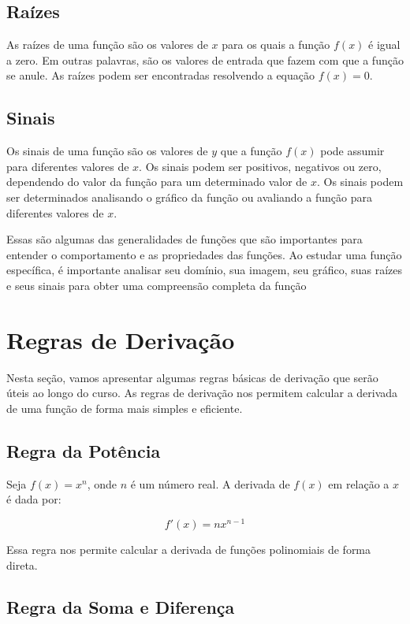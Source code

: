 \documentclass[12pt]{article}
\begin{document}
\subsection{Raízes}

As raízes de uma função são os valores de $x$ para os quais a função $f(x)$ é igual a zero. Em outras palavras, são os valores de entrada que fazem com que a função se anule. As raízes podem ser encontradas resolvendo a equação $f(x) = 0$.

\subsection{Sinais}

Os sinais de uma função são os valores de $y$ que a função $f(x)$ pode assumir para diferentes valores de $x$. Os sinais podem ser positivos, negativos ou zero, dependendo do valor da função para um determinado valor de $x$. Os sinais podem ser determinados analisando o gráfico da função ou avaliando a função para diferentes valores de $x$.

Essas são algumas das generalidades de funções que são importantes para entender o comportamento e as propriedades das funções. Ao estudar uma função específica, é importante analisar seu domínio, sua imagem, seu gráfico, suas raízes e seus sinais para obter uma compreensão completa da função


\section{Regras de Derivação}
Nesta seção, vamos apresentar algumas regras básicas de derivação que serão úteis ao longo do curso. As regras de derivação nos permitem calcular a derivada de uma função de forma mais simples e eficiente.

\subsection{Regra da Potência}
Seja $f(x) = x^n$, onde $n$ é um número real. A derivada de $f(x)$ em relação a $x$ é dada por:

\[
f'(x) = nx^{n-1}
\]

Essa regra nos permite calcular a derivada de funções polinomiais de forma direta.

\subsection{Regra da Soma e Diferença}
\end{document}
